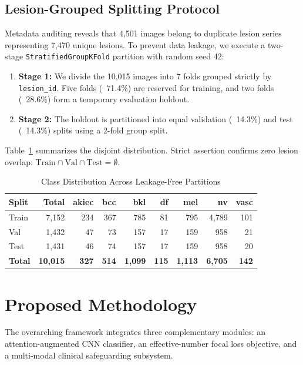 \documentclass[conference]{IEEEtran}
\begin{document}
\subsection{Lesion-Grouped Splitting Protocol}
Metadata auditing reveals that 4,501 images belong to duplicate lesion series representing 7,470 unique lesions. To prevent data leakage, we execute a two-stage \texttt{StratifiedGroupKFold} partition with random seed 42:
\begin{enumerate}
    \item \textbf{Stage 1:} We divide the 10,015 images into 7 folds grouped strictly by \texttt{lesion\_id}. Five folds (~71.4\%) are reserved for training, and two folds (~28.6\%) form a temporary evaluation holdout.
    \item \textbf{Stage 2:} The holdout is partitioned into equal validation (~14.3\%) and test (~14.3\%) splits using a 2-fold group split.
\end{enumerate}

Table~\ref{tab:split} summarizes the disjoint distribution. Strict assertion confirms zero lesion overlap: $\text{Train} \cap \text{Val} \cap \text{Test} = \emptyset$.

\begin{table}[htbp]
\caption{Class Distribution Across Leakage-Free Partitions}
\label{tab:split}
\centering
\begin{tabular}{lrrrrrrrr}
\toprule
\textbf{Split} & \textbf{Total} & \textbf{akiec} & \textbf{bcc} & \textbf{bkl} & \textbf{df} & \textbf{mel} & \textbf{nv} & \textbf{vasc} \\
\midrule
Train & 7,152 & 234 & 367 & 785 & 81 & 795 & 4,789 & 101 \\
Val & 1,432 & 47 & 73 & 157 & 17 & 159 & 958 & 21 \\
Test & 1,431 & 46 & 74 & 157 & 17 & 159 & 958 & 20 \\
\midrule
\textbf{Total} & \textbf{10,015} & \textbf{327} & \textbf{514} & \textbf{1,099} & \textbf{115} & \textbf{1,113} & \textbf{6,705} & \textbf{142} \\
\bottomrule
\end{tabular}
\end{table}

\section{Proposed Methodology}
The overarching framework integrates three complementary modules: an attention-augmented CNN classifier, an effective-number focal loss objective, and a multi-modal clinical safeguarding subsystem.
\end{document}
